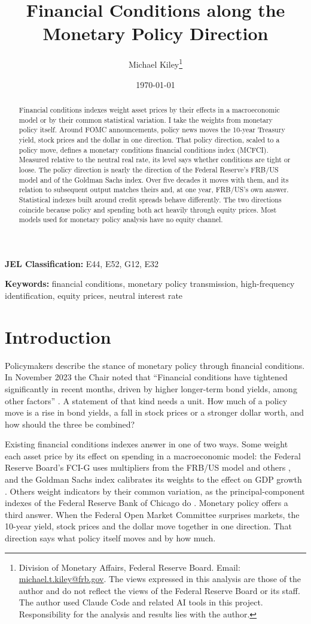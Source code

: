 \documentclass[11pt]{article}
\title{Financial Conditions along the Monetary Policy Direction}
\author{Michael Kiley\thanks{Division of Monetary Affairs, Federal Reserve Board. Email: \href{mailto:michael.t.kiley@frb.gov}{michael.t.kiley@frb.gov}. The views expressed in this analysis are those of the author and do not reflect the views of the Federal Reserve Board or its staff. The author used Claude Code and related AI tools in this project. Responsibility for the analysis and results lies with the author.}}
\date{\today}
\begin{document}
\maketitle

\begin{abstract}
Financial conditions indexes weight asset prices by their effects in a macroeconomic model or by their common statistical variation. I take the weights from monetary policy itself. Around FOMC announcements, policy news moves the 10-year Treasury yield, stock prices and the dollar in one direction. That policy direction, scaled to a policy move, defines a monetary conditions financial conditions index (MCFCI). Measured relative to the neutral real rate, its level says whether conditions are tight or loose. The policy direction is nearly the direction of the Federal Reserve's FRB/US model and of the Goldman Sachs index. Over five decades it moves with them, and its relation to subsequent output matches theirs and, at one year, FRB/US's own answer. Statistical indexes built around credit spreads behave differently. The two directions coincide because policy and spending both act heavily through equity prices. Most models used for monetary policy analysis have no equity channel.
\end{abstract}

\noindent\textbf{JEL Classification:} E44, E52, G12, E32

\noindent\textbf{Keywords:} financial conditions, monetary policy transmission, high-frequency identification, equity prices, neutral interest rate

\pagestyle{plain}
\newpage
{}

\section{Introduction}\label{sec:intro}
Policymakers describe the stance of monetary policy through financial conditions. In November 2023 the Chair noted that ``Financial conditions have tightened significantly in recent months, driven by higher longer-term bond yields, among other factors'' \citep{powell2023}. A statement of that kind needs a unit. How much of a policy move is a rise in bond yields, a fall in stock prices or a stronger dollar worth, and how should the three be combined?

Existing financial conditions indexes answer in one of two ways. Some weight each asset price by its effect on spending in a macroeconomic model: the Federal Reserve Board's FCI-G uses multipliers from the FRB/US model and others \citep{ajello2023}, and the Goldman Sachs index calibrates its weights to the effect on GDP growth \citep{hatzius2010}. Others weight indicators by their common variation, as the principal-component indexes of the Federal Reserve Bank of Chicago do \citep{brave2011}. Monetary policy offers a third answer. When the Federal Open Market Committee surprises markets, the 10-year yield, stock prices and the dollar move together in one direction. That direction says what policy itself moves and by how much.
\end{document}
